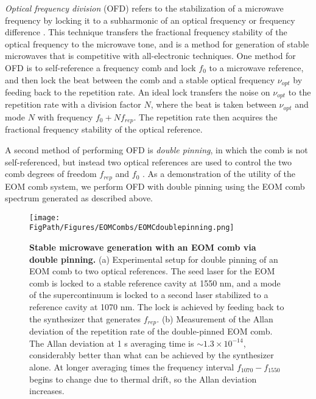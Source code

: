 \textit{Optical frequency division} (OFD) refers to the stabilization of a microwave frequency by locking it to a subharmonic of an optical frequency or frequency difference \cite{McFerran2005,Fortier2011}. This technique transfers the fractional frequency stability of the optical frequency to the microwave tone, and is a method for generation of stable microwaves that is competitive with all-electronic techniques. One method for OFD is to self-reference a frequency comb and lock $f_0$ to a microwave reference, and then lock the beat between the comb and a stable optical frequency $\nu_{opt}$ by feeding back to the repetition rate. An ideal lock transfers the noise on $\nu_{opt}$ to the repetition rate with a division factor $N$, where the beat is taken between $\nu_{opt}$ and mode $N$ with frequency $f_0+Nf_{rep}$. The repetition rate then acquires the fractional frequency stability of the optical reference.

A second method of performing OFD is \textit{double pinning}, in which the comb is not self-referenced, but instead two optical references are used to control the two comb degrees of freedom $f_{rep}$ and $f_0$ \cite{Swann2011,Papp2014,Li2014b}. As a demonstration of the utility of the EOM comb system, we perform OFD with double pinning using the EOM comb spectrum generated as described above.

\begin{figure}[htpb]
	\begin{center}
		\texttt{[image: \\FigPath/Figures/EOMCombs/EOMCdoublepinning.png]}
	\end{center}
	\caption[Stable microwave generation with an EOM comb via double pinning]{\textbf{Stable microwave generation with an EOM comb via double pinning.} (a) Experimental setup for double pinning of an EOM comb to two optical references. The seed laser for the EOM comb is locked to a stable reference cavity at 1550 nm, and a mode of the supercontinuum is locked to a second laser stabilized to a reference cavity at 1070 nm. The lock is achieved by feeding back to the synthesizer that generates $f_{rep}$. (b) Measurement of the Allan deviation of the repetition rate of the double-pinned EOM comb. The Allan deviation at 1 s averaging time is $\sim1.3\times10^{-14}$, considerably better than what can be achieved by the synthesizer alone. At longer averaging times the frequency interval $f_{1070}-f_{1550}$ begins to change due to thermal drift, so the Allan deviation increases.}
	\label{fig:EOMCdoublepinning}
\end{figure} 

